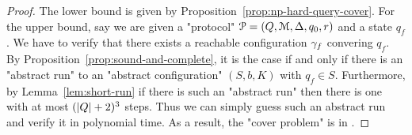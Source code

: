 \begin{proof}
	The lower bound is given by Proposition~\ref{prop:np-hard-query-cover}.
	For the upper bound, say we are given a "protocol" $\mathcal{P} = (Q, \mathcal{M}, \Delta, q_0, r)$ and a state $q_f$. We have to verify that there exists a reachable configuration $\gamma_f$ convering $q_f$. By Proposition~\ref{prop:sound-and-complete}, it is the case if and only if there is an "abstract run" to an "abstract configuration" $(S,b, K)$ with $q_f \in S$.
	Furthermore, by Lemma~\ref{lem:short-run} if there is such an "abstract run" then there is one with at most $(|Q|+2)^3$ steps. 
	Thus we can simply guess such an abstract run and verify it in polynomial time.
	As a result, the "cover problem" is in \NP. 
\end{proof}